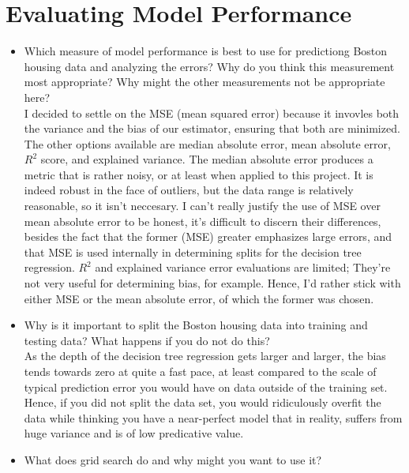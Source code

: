 \documentclass{amsart}
\begin{document}
\section{Evaluating Model Performance}
\begin{itemize}
	\item Which measure of model performance is best to use for predictiong Boston housing data and analyzing the errors?  Why do you think this measurement most appropriate?  Why might the other measurements not be appropriate here? \vspace{1mm}\\
		I decided to settle on the MSE (mean squared error) because it invovles both the variance and the bias of our estimator, ensuring that both are minimized.  The other options available are median absolute error, mean absolute error, $R^2$ score, and explained variance.  
		The median absolute error produces a metric that is rather noisy, or at least when applied to this project.  It is indeed robust in the face of outliers, but the data range is relatively reasonable, so it isn't neccesary.  
		I can't really justify the use of MSE over mean absolute error to be honest, it's difficult to discern their differences, besides the fact that the former (MSE) greater emphasizes large errors, and that MSE is used internally in determining splits for the decision tree regression.  $R^2$ and explained variance error evaluations are limited;  They're not very useful for determining bias, for example.  Hence, I'd rather stick with either MSE or the mean absolute error, of which the former was chosen.\vspace{1mm}
	\item Why is it important to split the Boston housing data into training and testing data?  What happens if you do not do this? \vspace{1mm}\\
		As the depth of the decision tree regression gets larger and larger, the bias tends towards zero at quite a fast pace, at least compared to the scale of typical prediction error you would have on data outside of the training set.  Hence, if you did not split the data set, you would ridiculously overfit the data while thinking you have a near-perfect model that in reality, suffers from huge variance and is of low predicative value. \vspace{1mm}
	\item What does grid search do and why might you want to use it? \vspace{1mm}\\

\end{itemize}
\end{document}
